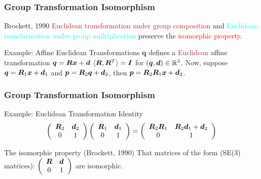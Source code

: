 \begin{frame}
	\frametitle{Group Transformation Isomorphism}
	\begin{block}{Brockett, 1990}
		\textcolor{brown}{Euclidean transformation under group composition} and  \textcolor{cyan}{Euclidean transformation under group multiplication} preserve the \textcolor{red}{isomorphic property}.
	\end{block}
	
	\begin{block}{Example: Affine Euclidean Transformations}
		$\bm{q}$ defines a \textcolor{brown}{Euclidean} \textcolor{light-blue}{affine transformation} $\bm{q} = \bm{R} \bm{x} + \bm{d}$  $\langle \bm{R}, \bm{R}^T\rangle = \bm{I}$ for $(\bm{q}, \bm{d}) \in \mathbb{R}^3$. Now, suppose $\bm{q} = \bm{R}_1 \bm{x} + \bm{d}_1$ and $\bm{p} = \bm{R}_2 \bm{q} + \bm{d}_2$, then $\bm{p} = \bm{R}_2 \bm{R}_1\bm{x}+ \bm{d}_2$. %
	\end{block}
\end{frame}


\begin{frame}
	\frametitle{Group Transformation Isomorphism}
	\begin{block}{Example: Euclidean Transformation Identity}
		\begin{align}
			\left(
			\begin{array}{cc}
				\bm{R}_2 & \bm{d}_2 \\
				0 & 1
			\end{array}
			\right)
			\left(
			\begin{array}{cc}
				\bm{R}_1 & \bm{d}_1 \\
				0 & 1
			\end{array}
			\right) = 
			\left(
			\begin{array}{cc}
				\bm{R}_2 \bm{R}_1 & \bm{R}_2\bm{d}_1 + \bm{d}_2 \\
				0 & 1
			\end{array}
			\right)
		\end{align}
	\end{block}

	\begin{block}{The isomorphic property (Brockett, 1990)}
		That matrices of the form (SE(3) matrices):
		$	\left(
			\begin{array}{cc}
				\bm{R} & \bm{d} \\
				0 & 1
			\end{array}
			\right) $
	are isomorphic.
	\end{block}
\end{frame}

